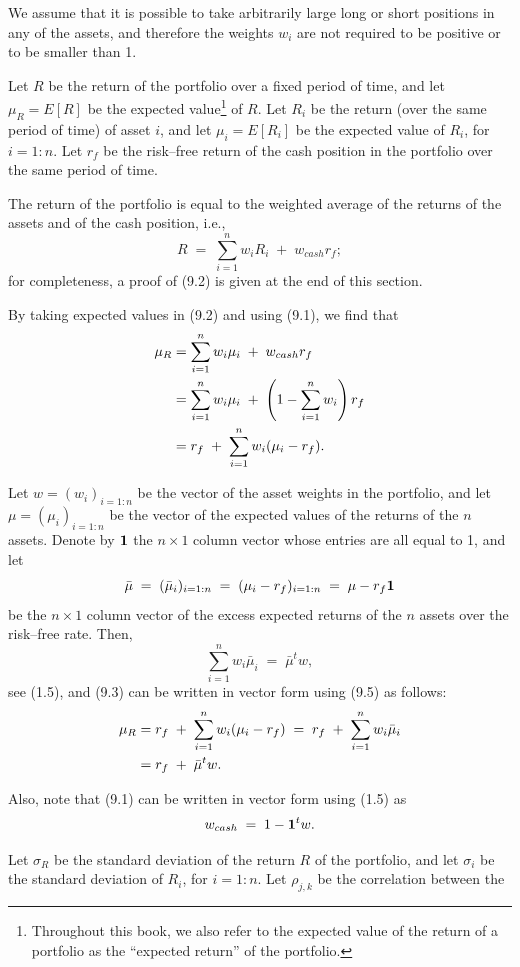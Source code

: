 
We assume that it is possible to take arbitrarily large long or short positions in any
of the assets, and therefore the weights $w_i$ are not required to be positive or to be
smaller than 1.

Let $R$ be the return of the portfolio over a fixed period of time, and let $\mu_R =
E[R]$ be the expected value\footnote{Throughout this book, we also refer to the
expected value of the return of a portfolio as the ``expected return'' of the
portfolio.} of $R$. Let $R_i$ be the return (over the same period of time) of asset
$i$, and let $\mu_i = E[R_i]$ be the expected value of $R_i$, for $i = 1:n$. Let $r_f$
be the risk--free return of the cash position in the portfolio over the same period of
time.

The return of the portfolio is equal to the weighted average of the returns of the
assets and of the cash position, i.e.,
\begin{equation}
R \;=\; \sum_{i=1}^n w_iR_i \;+\; w_{cash}r_f;
\end{equation}
for completeness, a proof of (9.2) is given at the end of this section.

By taking expected values in (9.2) and using (9.1), we find that
\begin{align}
\mu_R &= \sum_{i=1}^n w_i\mu_i \;+\; w_{cash}r_f \notag\\
&= \sum_{i=1}^n w_i\mu_i \;+\; \left(1-\sum_{i=1}^n w_i\right)r_f \notag\\
&= r_f \;+\; \sum_{i=1}^n w_i(\mu_i-r_f).
\end{align}

Let $w = (w_i)_{i=1:n}$ be the vector of the asset weights in the portfolio, and let
$\mu = (\mu_i)_{i=1:n}$ be the vector of the expected values of the returns of the $n$
assets. Denote by $\mathbf{1}$ the $n\times 1$ column vector whose entries are all
equal to 1, and let
\begin{equation}
\bar\mu \;=\; (\bar\mu_i)_{i=1:n} \;=\; (\mu_i-r_f)_{i=1:n} \;=\; \mu-r_f\mathbf{1}
\end{equation}
be the $n\times1$ column vector of the excess expected returns of the $n$ assets over
the risk--free rate. Then,
\begin{equation}
\sum_{i=1}^n w_i\bar\mu_i \;=\; \bar\mu^tw,
\end{equation}
see (1.5), and (9.3) can be written in vector form using (9.5) as follows:
\begin{align}
\mu_R &= r_f \;+\; \sum_{i=1}^n w_i(\mu_i-r_f) \;=\; r_f \;+\; \sum_{i=1}^n
w_i\bar\mu_i \notag\\
&= r_f \;+\; \bar\mu^tw.
\end{align}

Also, note that (9.1) can be written in vector form using (1.5) as
\begin{equation}
w_{cash} \;=\; 1 - \mathbf{1}^tw.
\end{equation}

Let $\sigma_R$ be the standard deviation of the return $R$ of the portfolio, and let
$\sigma_i$ be the standard deviation of $R_i$, for $i = 1:n$. Let $\rho_{j,k}$ be the
correlation between the
